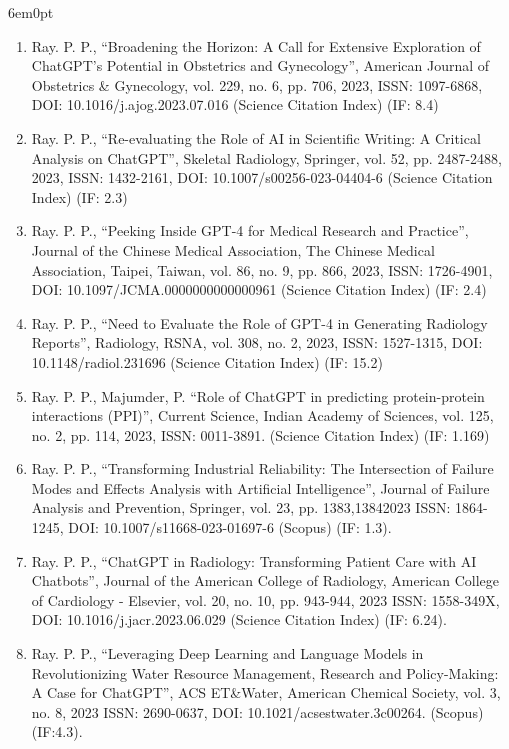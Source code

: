 \documentclass[11pt,a4paper]{moderncv}
\begin{document}
\begin{adjustwidth}{6em}{0pt}
\begin{enumerate}
		\item Ray. P. P., “Broadening the Horizon: A Call for Extensive Exploration of ChatGPT's Potential in Obstetrics and Gynecology”, American Journal of Obstetrics \& Gynecology, vol. 229, no. 6, pp. 706, 2023, ISSN: 1097-6868, DOI: 10.1016/j.ajog.2023.07.016 (Science Citation Index) (IF: 8.4)
		
		\item Ray. P. P., “Re-evaluating the Role of AI in Scientific Writing: A Critical Analysis on ChatGPT”, Skeletal Radiology, Springer, vol. 52, pp. 2487-2488, 2023, ISSN: 1432-2161, DOI: 10.1007/s00256-023-04404-6 (Science Citation Index) (IF: 2.3)
		
		\item Ray. P. P., “Peeking Inside GPT-4 for Medical Research and Practice”, Journal of the Chinese Medical Association, The Chinese Medical Association, Taipei, Taiwan, vol. 86, no. 9, pp. 866, 2023, ISSN: 1726-4901, DOI: 10.1097/JCMA.0000000000000961 (Science Citation Index) (IF: 2.4)
		
		\item Ray. P. P., “Need to Evaluate the Role of GPT-4 in Generating Radiology Reports”, Radiology, RSNA, vol. 308, no. 2, 2023, ISSN: 1527-1315, DOI: 10.1148/radiol.231696 (Science Citation Index) (IF: 15.2)
		
		\item Ray. P. P., Majumder, P. “Role of ChatGPT in predicting protein-protein interactions (PPI)”, Current Science, Indian Academy of Sciences, vol. 125, no. 2, pp. 114, 2023, ISSN: 0011-3891. (Science Citation Index) (IF: 1.169)
				
		\item Ray. P. P., “Transforming Industrial Reliability: The Intersection of Failure Modes and Effects Analysis with Artificial Intelligence”, Journal of Failure Analysis and Prevention, Springer, vol. 23, pp. 1383,13842023 ISSN: 1864-1245, DOI: 10.1007/s11668-023-01697-6 (Scopus) (IF: 1.3). 
		
		\item Ray. P. P., “ChatGPT in Radiology: Transforming Patient Care with AI Chatbots”, Journal of the American College of Radiology, American College of Cardiology - Elsevier, vol. 20, no. 10, pp. 943-944, 2023 ISSN: 1558-349X, DOI: 10.1016/j.jacr.2023.06.029 (Science Citation Index) (IF: 6.24). 
		
		\item Ray. P. P., “Leveraging Deep Learning and Language Models in Revolutionizing Water Resource Management, Research and Policy-Making: A Case for ChatGPT”, ACS ET\&Water, American Chemical Society, vol. 3, no. 8, 2023 ISSN: 2690-0637, DOI: 10.1021/acsestwater.3c00264. (Scopus) (IF:4.3). 
		

\end{enumerate}
\end{adjustwidth}
\end{document}
